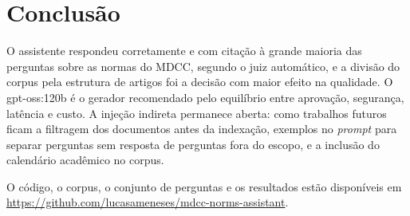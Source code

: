\chapter{Conclusão}
\label{cap:conclusao}

O assistente respondeu corretamente e com citação à grande maioria das perguntas sobre as
normas do MDCC, segundo o juiz automático, e a divisão do corpus pela estrutura de artigos
foi a decisão com maior efeito na qualidade. O gpt-oss:120b é o gerador recomendado pelo
equilíbrio entre aprovação, segurança, latência e custo. A injeção indireta permanece
aberta: como trabalhos futuros ficam a filtragem dos documentos antes da indexação,
exemplos no \textit{prompt} para separar perguntas sem resposta de perguntas fora do
escopo, e a inclusão do calendário acadêmico no corpus.

O código, o corpus, o conjunto de perguntas e os resultados estão disponíveis em
\url{https://github.com/lucasameneses/mdcc-norms-assistant}.
